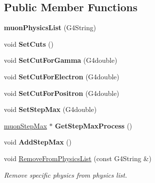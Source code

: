 \subsection*{Public Member Functions}
\begin{DoxyCompactItemize}
\item 
\mbox{\label{classmuonPhysicsList_aec1adc0f09839b739713b95b60a3433c}} 
{\bfseries muon\+Physics\+List} (G4\+String)
\item 
\mbox{\label{classmuonPhysicsList_ae567a51ca4aff57c7148bb3886bff6d0}} 
void {\bfseries Set\+Cuts} ()
\item 
\mbox{\label{classmuonPhysicsList_a462e709c365cb2c502eba1c71fb24d06}} 
void {\bfseries Set\+Cut\+For\+Gamma} (G4double)
\item 
\mbox{\label{classmuonPhysicsList_a0d5e15f23de27e9ed9876eb9fb481b7f}} 
void {\bfseries Set\+Cut\+For\+Electron} (G4double)
\item 
\mbox{\label{classmuonPhysicsList_a610582e1c0d233f2c5c0914189547d08}} 
void {\bfseries Set\+Cut\+For\+Positron} (G4double)
\item 
\mbox{\label{classmuonPhysicsList_a43f30e66e8518d33040777262bbc829f}} 
void {\bfseries Set\+Step\+Max} (G4double)
\item 
\mbox{\label{classmuonPhysicsList_a673fde0059508d78547a84db91971ce9}} 
\hyperlink{classmuonStepMax}{muon\+Step\+Max} $\ast$ {\bfseries Get\+Step\+Max\+Process} ()
\item 
\mbox{\label{classmuonPhysicsList_a9d96538f586114bd672f975658527527}} 
void {\bfseries Add\+Step\+Max} ()
\item 
\mbox{\label{classmuonPhysicsList_aaba742da0c9dc44a6498bfc804e284eb}} 
void \hyperlink{classmuonPhysicsList_aaba742da0c9dc44a6498bfc804e284eb}{Remove\+From\+Physics\+List} (const G4\+String \&)
\begin{DoxyCompactList}\small\item\em Remove specific physics from physics list. \end{DoxyCompactList}\item 

\end{DoxyCompactItemize}
